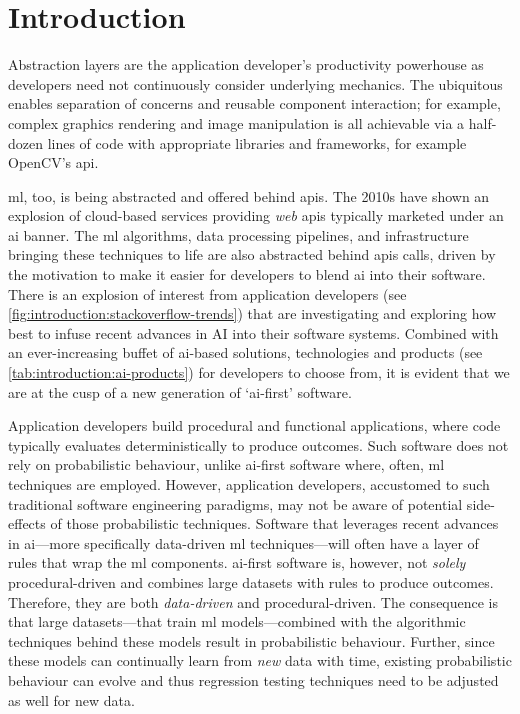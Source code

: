 \chapter{Introduction}
\label{ch:introduction}
\graphicspath{{mainmatter/introduction/figures/}}

Abstraction layers are the application developer's productivity powerhouse as developers need not continuously consider underlying mechanics. The ubiquitous  enables separation of concerns and reusable component interaction; for example, complex graphics rendering and image manipulation is all achievable via a half-dozen lines of code with appropriate libraries and frameworks, for example OpenCV's \gls{api}.

\Gls{ml}, too, is being abstracted and offered behind \glspl{api}. The 2010s have shown an explosion of cloud-based services providing \textit{web} \glspl{api} typically marketed under an \gls{ai} banner. The \gls{ml} algorithms, data processing pipelines, and infrastructure bringing these techniques to life are also abstracted behind \glspl{api} calls, driven by the motivation to make it easier for developers to blend \gls{ai} into their software.
There is an explosion of interest from application developers (see \cref{fig:introduction:stackoverflow-trends}) that are investigating and exploring how best to infuse recent advances in AI into their software systems. Combined with an ever-increasing buffet of \gls{ai}-based solutions, technologies and products (see \cref{tab:introduction:ai-products}) for developers to choose from, it is evident that we are at the cusp of a new generation of `\gls{ai}-first' software.

Application developers build procedural and functional applications, where code typically evaluates deterministically to produce outcomes. Such software does not rely on probabilistic behaviour, unlike \gls{ai}-first software where, often, \gls{ml} techniques are employed. However, application developers, accustomed to such traditional software engineering paradigms, may not be aware of potential side-effects of those probabilistic techniques. Software that leverages recent advances in \gls{ai}---more specifically data-driven \gls{ml} techniques---will often have a layer of rules that wrap the \gls{ml} components.
\Gls{ai}-first software is, however, not \textit{solely} procedural-driven and combines large datasets with rules to produce outcomes. Therefore, they are both \textit{data-driven} and procedural-driven. The consequence is that large datasets---that train \gls{ml} models---combined with the algorithmic techniques behind these models result in probabilistic behaviour. Further, since these models can continually learn from \textit{new} data with time, existing probabilistic behaviour can evolve and thus regression testing techniques need to be adjusted as well for new data. 

